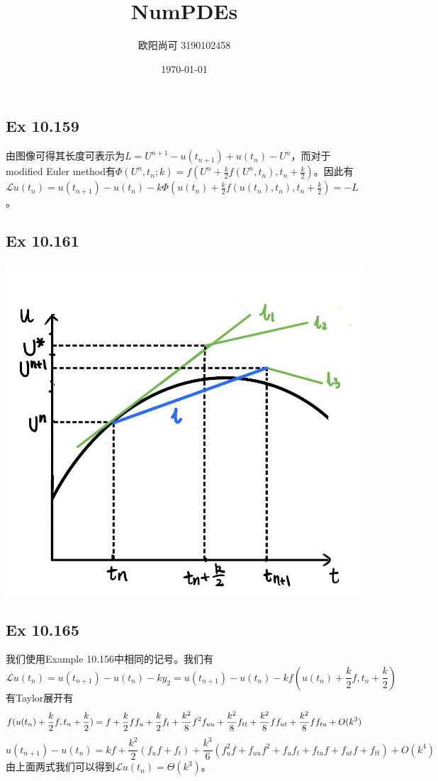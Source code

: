 \documentclass{article}
\title{NumPDEs}
\author{欧阳尚可  3190102458}
\date{\today}
\begin{document}
\maketitle
\newpage

\subsection*{Ex 10.159}
\indent 由图像可得其长度可表示为$L=U^{n+1}-u(t_{n+1})+u(t_n)-U^n$，而对于modified Euler method有$\Phi(U^n,t_n;k)=f(U^n+\frac{k}{2}f(U^n,t_n),t_n+\frac{k}{2})$。因此有$\mathcal{L}u(t_n)=u(t_{n+1})-u(t_n)-k\Phi(u(t_n)+\frac{k}{2}f(u(t_n),t_n),t_n+\frac{k}{2})= -L$。

\subsection*{Ex 10.161}
\includegraphics[scale = 0.6]{Ex161.png}

\subsection*{Ex 10.165}
\indent 我们使用Example 10.156中相同的记号。我们有
$$
\mathcal{L}u(t_n)=u(t_{n+1})-u(t_n)-ky_2=u(t_{n+1})-u(t_n)-kf(u(t_n)+\frac{k}{2}f,t_n+\frac{k}{2})
$$
有Taylor展开有
$$
f(u(t_n)+\frac{k}{2}f,t_n+\frac{k}{2})=f+\frac{k}{2}ff_u+\frac{k}{2}f_t+\frac{k^2}{8}f^2f_{uu}+\frac{k^2}{8}f_{tt}+\frac{k^2}{8}ff_{ut}+\frac{k^2}{8}ff_{tu}+O(k^3)\\
$$
$$
u(t_{n+1})-u(t_n)=kf+\frac{k^2}{2}(f_uf+f_t)+\frac{k^3}{6}(f_u^2f+f_{uu}f^2+f_uf_t+f_{tu}f+f_{ut}f+f_{tt})+O(k^4)
$$
由上面两式我们可以得到$\mathcal{L}u(t_n)=\Theta(k^3)$。
\end{document}
